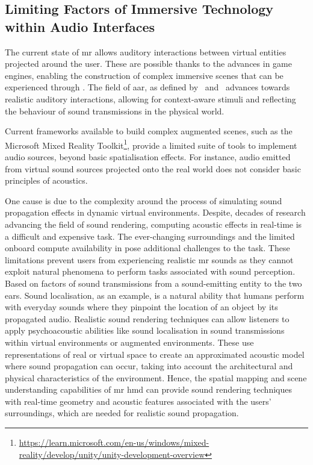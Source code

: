 \subsection{Limiting Factors of Immersive Technology within Audio Interfaces}
The current state of \acrshort{mr} allows auditory interactions between virtual entities projected around the user. These are possible thanks to the advances in game engines, enabling the construction of complex immersive scenes that can be experienced through . The field of \acrfull{aar}, as defined by~\cite{yang2022audio} and~\cite{yang2019audio} advances towards realistic auditory interactions, allowing for context-aware stimuli and reflecting the behaviour of sound transmissions in the physical world.\par
Current frameworks available to build complex augmented scenes, such as the Microsoft Mixed Reality Toolkit\footnote{\url{https://learn.microsoft.com/en-us/windows/mixed-reality/develop/unity/unity-development-overview}}, provide a limited suite of tools to implement audio sources, beyond basic spatialisation effects. For instance, audio emitted from virtual sound sources projected onto the real world does not consider basic principles of acoustics.\par
One cause is due to the complexity around the process of simulating sound propagation effects in dynamic virtual environments. Despite, decades of research advancing the field of sound rendering, computing acoustic effects in real-time is a difficult and expensive task. The ever-changing surroundings and the limited onboard compute availability in  pose additional challenges to the task.
These limitations prevent users from experiencing realistic \acrshort{mr} sounds as they cannot exploit natural phenomena to perform tasks associated with sound perception. Based on factors of sound transmissions from a sound-emitting entity to the two ears. Sound localisation, as an example, is a natural ability that humans perform with everyday sounds where they pinpoint the location of an object by its propagated audio. Realistic sound rendering techniques can allow listeners to apply psychoacoustic abilities like sound localisation in sound transmissions within virtual environments or augmented environments. These use representations of real or virtual space to create an approximated acoustic model where sound propagation can occur, taking into account the architectural and physical characteristics of the environment. Hence, the spatial mapping and scene understanding capabilities of \acrshort{mr} \acrshort{hmd} can provide sound rendering techniques with real-time geometry and acoustic features associated with the users' surroundings, which are needed for realistic sound propagation.\par
